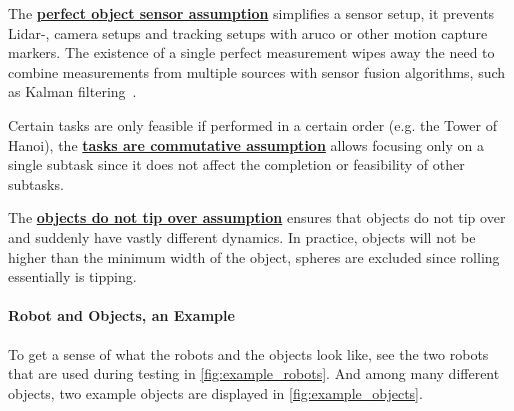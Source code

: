 The \hyperref[assumption:perfect_object_sensor]{\textbf{perfect object sensor assumption}} simplifies a sensor setup, it prevents Lidar-, camera setups and tracking setups with aruco or other motion capture markers. The existence of a single perfect measurement wipes away the need to combine measurements from multiple sources with sensor fusion algorithms, such as Kalman filtering~\cite{verhaegen_filtering_2007}.\bs

Certain tasks are only feasible if performed in a certain order (e.g. the Tower of Hanoi), the \hyperref[assumption:order_does_not_matter]{\textbf{tasks are commutative assumption}} allows focusing only on a single subtask since it does not affect the completion or feasibility of other subtasks.\bs

The \hyperref[assumption:no_tipping]{\textbf{objects do not tip over assumption}} ensures that objects do not tip over and suddenly have vastly different dynamics. In practice, objects will not be higher than the minimum width of the object, spheres are excluded since rolling essentially is tipping.


\paragraph{Robot and Objects, an Example}
To get a sense of what the robots and the objects look like, see the two robots that are used during testing in \cref{fig:example_robots}. And among many different objects, two example objects are displayed in \cref{fig:example_objects}.

